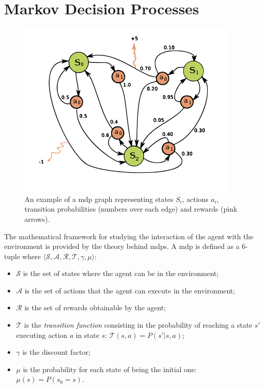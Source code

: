 \section{Markov Decision Processes}
\begin{figure}[t]
\begin{minipage}{\textwidth}
\begin{center}
  \includegraphics[scale=.6]{img/mdp2.png}
\end{center}
\end{minipage}
\caption[Example of a Markov Decision Process]{An example of a \gls{mdp} graph representing states $S_i$, actions $a_i$, transition probabilities (numbers over each edge) and rewards (pink arrows).}\label{F:mdp2}
\end{figure}
The mathematical framework for studying the interaction of the agent with the environment is provided by the theory behind \glspl{mdp}. A \gls{mdp} is defined as a $6$-tuple where $\langle \mathcal{S}, \mathcal{A}, \mathcal{R}, \mathcal{T}, \gamma, \mu \rangle$:
\begin{itemize}
 \item $\mathcal{S}$ is the set of states where the agent can be in the environment;
 \item $\mathcal{A}$ is the set of actions that the agent can execute in the environment;
 \item $\mathcal{R}$ is the set of rewards obtainable by the agent;
 \item $\mathcal{T}$ is the \textit{transition function} consisting in the probability of reaching a state $s'$ executing action $a$ in state $s$: $\mathcal{T}(s, a) = P(s' | s, a)$;
 \item $\gamma$ is the discount factor;
 \item $\mu$ is the probability for each state of being the initial one: $\mu(s) = P(s_0 = s)$.
\end{itemize}
